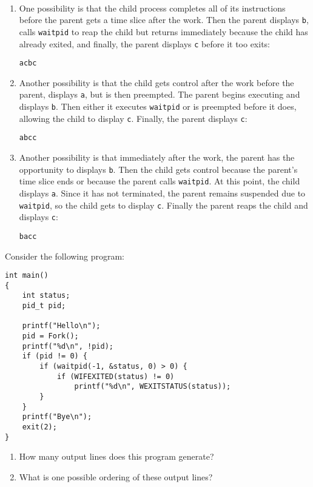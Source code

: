 \documentclass[12pt]{article}
\newenvironment{ex}[2][Exercise]{\begin{trivlist}
		\item[\hskip \labelsep {\bfseries #1}\hskip \labelsep {\bfseries #2.}]}{\end{trivlist}}
\newenvironment{sol}[1][Solution]{\begin{trivlist}
		\item[\hskip \labelsep {\bfseries #1:}]}{\end{trivlist}}
\begin{document}
\begin{sol}
	\
	\begin{enumerate}
		\item One possibility is that the child process completes all of its instructions before the
		parent gets a time slice after the work. Then the parent displays \texttt{b}, calls
		\texttt{waitpid} to reap the child but returns immediately because the child has already
		exited, and finally, the parent displays \texttt{c} before it too exits:
		\begin{lstlisting}[language={}]
acbc
		\end{lstlisting}
		\item Another possibility is that the child gets control after the work before the parent,
		displays \texttt{a}, but is then preempted. The parent begins executing and displays
		\texttt{b}. Then either it executes \texttt{waitpid} or is preempted before it does,
		allowing the child to display \texttt{c}. Finally, the parent displays \texttt{c}:
		\begin{lstlisting}[language={}]
abcc
		\end{lstlisting}
		\item Another possibility is that immediately after the work, the parent has the opportunity
		to displays \texttt{b}. Then the child gets control because the parent's time slice
		ends or because the parent calls \texttt{waitpid}. At this point, the child displays \texttt{a}.
		Since it has not terminated, the parent remains suspended due to \texttt{waitpid}, so
		the child gets to display \texttt{c}. Finally the parent reaps the child and displays
		\texttt{c}:
		\begin{lstlisting}[language={}]
bacc
		\end{lstlisting}
	\end{enumerate}
\end{sol}

\begin{ex}{8.4}
	Consider the following program:
	\begin{lstlisting}
int main()
{
	int status;
	pid_t pid;
	
	printf("Hello\n");
	pid = Fork();
	printf("%d\n", !pid);
	if (pid != 0) {
		if (waitpid(-1, &status, 0) > 0) {
			if (WIFEXITED(status) != 0)
				printf("%d\n", WEXITSTATUS(status));
		}
	}
	printf("Bye\n");
	exit(2);
}
	\end{lstlisting}
	\begin{enumerate}[label=(\alph*)]
		\item How many output lines does this program generate?
		\item What is one possible ordering of these output lines?
	\end{enumerate}
\end{ex}
\end{document}
